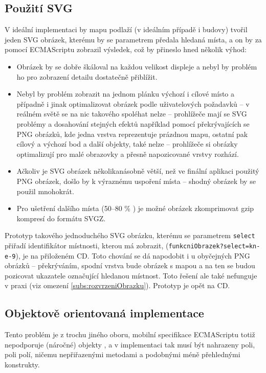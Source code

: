 \subsection{Použití SVG}
V ideální implementaci by mapu podlaží (v ideálním případě i budovy) tvořil jeden SVG obrázek, kterému by se parametrem předala hledaná místa, a on by za pomocí ECMAScriptu zobrazil výsledek, což by přineslo hned několik výhod:
\begin{itemize}
 \item Obrázek by se dobře škáloval na každou velikost displeje a nebyl by problém ho pro zobrazení detailu dostatečně přiblížit.
 \item Nebyl by problém zobrazit na jednom plánku výchozí i cílové místo a případně i jinak optimalizovat obrázek podle uživatelových požadavků -- v reálném světě se na nic takového spoléhat nelze -- prohlížeče mají se SVG problémy a dosahování stejných efektů například pomocí překrývajících se PNG obrázků, kde jedna vrstva reprezentuje prázdnou mapu, ostatní pak cílový a výchozí bod a další objekty, také nelze -- prohlížeče si obrázky optimalizují pro malé obrazovky a přesně napozicované vrstvy rozhází.
 \item Ačkoliv je SVG obrázek několikanásobně větší, než ve finální aplikaci použitý PNG obrázek, došlo by k výraznému uspoření místa -- shodný obrázek by se použil mnohokrát.
 \item Pro ušetření dalšího místa (50--80 \% \cite{SvgzAdobe}) je možné obrázek zkomprimovat gzip kompresí do formátu SVGZ.
\end{itemize}

Prototyp takového jednoduchého SVG obrázku, kterému se parametrem \texttt{select} přiřadí identifikátor místnosti, kterou má zobrazit, (\texttt{funkcniObrazek?select=kn-e-9}), je na přiloženém CD. Toto chování se dá napodobit i u obyčejných PNG obrázků -- překrýváním, spodní vrstva bude obrázek s mapou a na ten se budou pozicovat ukazatele označující hledanou místnost. Toto řešení ale také nefunguje v praxi (viz omezení \ref{subs:rozvrzeniObrazku}). Prototyp je opět na CD.

\subsection{Objektově orientovaná implementace}
Tento problém je z trochu jiného oboru, mobilní specifikace ECMAScriptu totiž nepodporuje (náročné) objekty \cite{EsMpDoc}, a v implementaci tak musí být nahrazeny poli, poli polí, ničemu nepřiřazenými metodami a podobnými méně přehlednými konstrukty.

